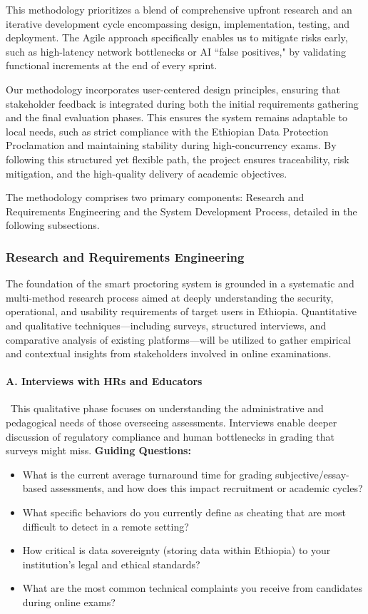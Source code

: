 This methodology prioritizes a blend of comprehensive upfront research and an iterative development cycle encompassing design, implementation, testing, and deployment. The Agile approach specifically enables us to mitigate risks early, such as high-latency network bottlenecks or AI ``false positives," by validating functional increments at the end of every sprint.

Our methodology incorporates user-centered design principles, ensuring that stakeholder feedback is integrated during both the initial requirements gathering and the final evaluation phases. This ensures the system remains adaptable to local needs, such as strict compliance with the Ethiopian Data Protection Proclamation and maintaining stability during high-concurrency exams. By following this structured yet flexible path, the project ensures traceability, risk mitigation, and the high-quality delivery of academic objectives.

The methodology comprises two primary components: Research and Requirements Engineering and the System Development Process, detailed in the following subsections.

\subsubsection{Research and Requirements Engineering}
The foundation of the smart proctoring system is grounded in a systematic and multi-method research process aimed at deeply understanding the security, operational, and usability requirements of target users in Ethiopia. Quantitative and qualitative techniques—including surveys, structured interviews, and comparative analysis of existing platforms—will be utilized to gather empirical and contextual insights from stakeholders involved in online examinations.

\paragraph{A. Interviews with HRs and Educators}\
This qualitative phase focuses on understanding the administrative and pedagogical needs of those overseeing assessments. Interviews enable deeper discussion of regulatory compliance and human bottlenecks in grading that surveys might miss.
\textbf{Guiding Questions:}
\begin{itemize}
    \item What is the current average turnaround time for grading subjective/essay-based assessments, and how does this impact recruitment or academic cycles?
    \item What specific behaviors do you currently define as cheating that are most difficult to detect in a remote setting?
    \item How critical is data sovereignty (storing data within Ethiopia) to your institution's legal and ethical standards?
    \item What are the most common technical complaints you receive from candidates during online exams?
\end{itemize}

